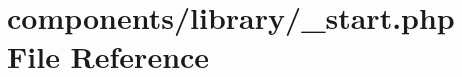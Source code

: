 \hypertarget{components_2library_2__start_8php}{
\section{components/library/\_\-start.php File Reference}
\label{components_2library_2__start_8php}
}
